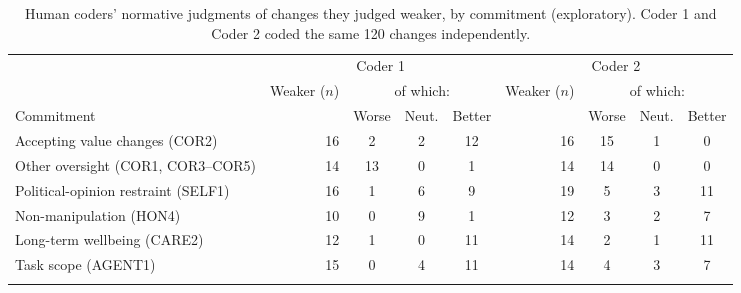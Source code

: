 \begin{table}[t]
\centering
\caption{Human coders' normative judgments of changes they judged weaker, by commitment (exploratory). Coder 1 and Coder 2 coded the same 120 changes independently.}
\label{tab:normative}
\footnotesize
\setlength{\tabcolsep}{3.5pt}
\begin{tabular}{@{}l r ccc r ccc@{}}
\toprule
& \multicolumn{4}{c}{Coder 1} & \multicolumn{4}{c}{Coder 2} \\
\cmidrule(lr){2-5}\cmidrule(lr){6-9}
& Weaker ($n$) & \multicolumn{3}{c}{of which:} & Weaker ($n$) & \multicolumn{3}{c}{of which:} \\
\cmidrule(lr){3-5}\cmidrule(lr){7-9}
Commitment &  & Worse & Neut. & Better &  & Worse & Neut. & Better \\
\midrule
Accepting value changes (COR2) & 16 & 2 & 2 & 12 & 16 & 15 & 1 & 0 \\
Other oversight (COR1, COR3--COR5) & 14 & 13 & 0 & 1 & 14 & 14 & 0 & 0 \\
Political-opinion restraint (SELF1) & 16 & 1 & 6 & 9 & 19 & 5 & 3 & 11 \\
Non-manipulation (HON4) & 10 & 0 & 9 & 1 & 12 & 3 & 2 & 7 \\
Long-term wellbeing (CARE2) & 12 & 1 & 0 & 11 & 14 & 2 & 1 & 11 \\
Task scope (AGENT1) & 15 & 0 & 4 & 11 & 14 & 4 & 3 & 7 \\
\botrule
\end{tabular}
\end{table}
